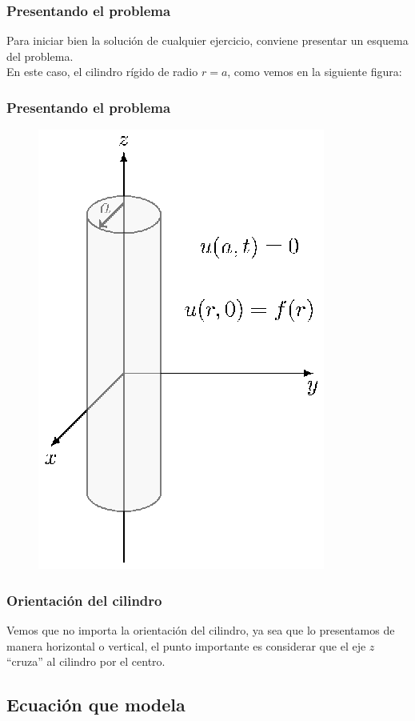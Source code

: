 \documentclass[12pt]{beamer}
\begin{document}
\begin{frame}
\frametitle{Presentando el problema}
Para iniciar bien la solución de cualquier ejercicio, conviene presentar un esquema del problema.
\\
\bigskip
\pause
En este caso, el cilindro rígido de radio $r = a$, como vemos en la siguiente figura:
\end{frame}
\begin{frame}
\frametitle{Presentando el problema}
\begin{figure}[H]
    \centering
    \includegraphics[scale=0.975]{Imagenes/plot_cilindro_Bessel_01.eps}
\end{figure}
\end{frame}
\begin{frame}
\frametitle{Orientación del cilindro}
Vemos que no importa la orientación del cilindro, ya sea que lo presentamos de manera horizontal o vertical, el punto importante es considerar que el eje $z$ \enquote{cruza} al cilindro por el centro.
\end{frame}

\subsection{Ecuación que modela}
\end{document}
